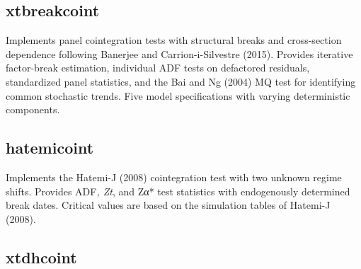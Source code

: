 \subsection{xtbreakcoint}\label{xtbreakcoint}

Implements panel cointegration tests with structural breaks and
cross-section dependence following Banerjee and Carrion-i-Silvestre
(2015). Provides iterative factor-break estimation, individual ADF tests
on defactored residuals, standardized panel statistics, and the Bai and
Ng (2004) MQ test for identifying common stochastic trends. Five model
specifications with varying deterministic components.

\begin{Shaded}
\begin{Highlighting}[]
\OtherTok{\textless{}{-}} \SpecialCharTok{\textasciitilde{}}\SpecialCharTok{+}
                        \NormalTok{, } \NormalTok{,}
                        \NormalTok{, } \NormalTok{)}
\end{Highlighting}
\end{Shaded}

\subsection{hatemicoint}\label{hatemicoint}

Implements the Hatemi-J (2008) cointegration test with two unknown
regime shifts. Provides ADF\emph{, Zt}, and Zα* test statistics with
endogenously determined break dates. Critical values are based on the
simulation tables of Hatemi-J (2008).

\begin{Shaded}
\begin{Highlighting}[]
\OtherTok{\textless{}{-}}  \NormalTok{)}
\end{Highlighting}
\end{Shaded}

\subsection{xtdhcoint}\label{xtdhcoint}

